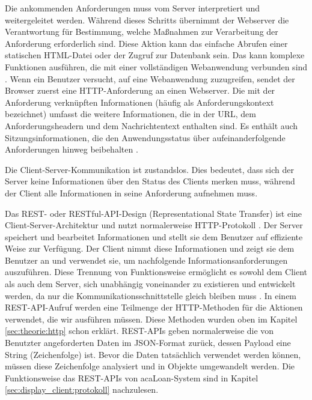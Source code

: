 Die ankommenden Anforderungen muss vom Server interpretiert und weitergeleitet werden. Während dieses Schritts übernimmt der Webserver die Verantwortung für Bestimmung, welche Maßnahmen zur Verarbeitung der Anforderung erforderlich sind. Diese Aktion kann das einfache Abrufen einer statischen HTML-Datei oder der Zugruf zur Datenbank sein. Das kann komplexe Funktionen ausführen, die mit einer vollständigen Webanwendung verbunden sind \cite[p.204]{shklar:webapplication}. Wenn ein Benutzer versucht, auf eine Webanwendung zuzugreifen, sendet der Browser zuerst eine HTTP-Anforderung an einen Webserver. Die mit der Anforderung verknüpften Informationen (häufig als Anforderungskontext bezeichnet) umfasst die weitere Informationen, die in der URL, dem Anforderungsheadern und dem Nachrichtentext enthalten sind. Es enthält auch Sitzungsinformationen, die den Anwendungsstatus über aufeinanderfolgende Anforderungen hinweg beibehalten \cite[p.205]{shklar:webapplication}.

Die Client-Server-Kommunikation ist zustandslos. Dies bedeutet, dass sich der Server keine Informationen über den Status des Clients merken muss, während der Client alle Informationen in seine Anforderung aufnehmen muss.

Das REST- oder RESTful-API-Design (Representational State Transfer) ist eine Client-Server-Architektur und nutzt normalerweise HTTP-Protokoll \cite{website:rest}. Der Server speichert und bearbeitet Informationen und stellt sie dem Benutzer auf effiziente Weise zur Verfügung. Der Client nimmt diese Informationen und zeigt sie dem Benutzer an und verwendet sie, um nachfolgende Informationsanforderungen auszuführen. Diese Trennung von Funktionsweise ermöglicht es sowohl dem Client als auch dem Server, sich unabhängig voneinander zu existieren und entwickelt werden, da nur die Kommunikationsschnittstelle gleich bleiben muss  \cite{website:rest2}. In einem REST-API-Aufruf werden eine Teilmenge der HTTP-Methoden für die Aktionen verwendet, die wir ausführen müssen. Diese Methoden wurden oben im Kapitel \ref{sec:theorie:http} schon erklärt. REST-APIs geben normalerweise die von Benutzter angeforderten Daten im JSON-Format zurück, dessen Payload eine String (Zeichenfolge) ist. Bevor die Daten tatsächlich verwendet werden können, müssen diese Zeichenfolge analysiert und in Objekte umgewandelt werden. Die Funktionsweise das REST-APIs von acaLoan-System sind in Kapitel \ref{sec:display_client:protokoll} nachzulesen.

